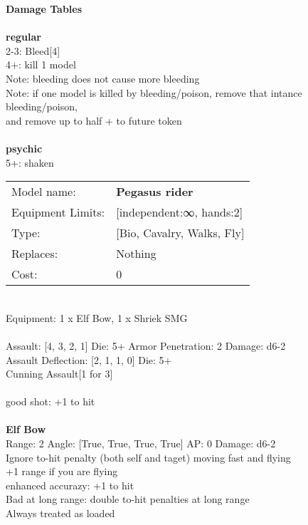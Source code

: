 {\bf Damage Tables} \\
\ \\ {\bf regular } \\
2-3: Bleed[4] \\
4+: kill 1 model \\
Note: bleeding does not cause more bleeding \\
Note: if one model is killed by bleeding/poison, remove that intance bleeding/poison, \\ and remove up to half + to future token \\
\ \\ {\bf psychic } \\
5+: shaken \\


\noindent
\begin{tabular}{ll}
Model name: &{\bf Pegasus rider } \\
Equipment Limits: &[independent:∞, hands:2] \\
Type: &[Bio, Cavalry, Walks, Fly] \\
Replaces: &Nothing \\
Cost: & 0\\
\end{tabular}
\ \\
Equipment: 1 x Elf Bow, 1 x Shriek SMG \\
\ \\
Assault: [4, 3, 2, 1] Die: 5+ Armor Penetration: 2 Damage: d6-2 \\
Assault Deflection: [2, 1, 1, 0] Die: 5+\\
\indent Cunning Assault[1 for 3]\\ 
 
\ \\
good shot: +1 to hit\\ 

\ \\
{\bf Elf Bow } \\



Range: 2  Angle: [True, True, True, True] AP: 0 Damage: d6-2 \\
Ignore to-hit penalty (both self and taget) moving fast and flying\\ 
+1 range if you are flying\\ 
enhanced accurazy: +1 to hit\\ 
Bad at long range: double to-hit penalties at long range\\ 
Always treated as loaded\\ 





